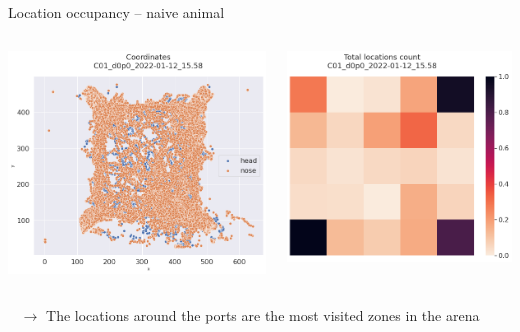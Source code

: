 \documentclass[bigger]{beamer}
\begin{document}
\begin{frame}[label={sec:org95a4104}]{Location occupancy -- naive animal}
\begin{columns}
\begin{column}{0.5\columnwidth}
\begin{center}
\includegraphics[width=.9\linewidth]{img/C01_d0p0_2022-01-12_15.58_coordinates.png}
\end{center}
\end{column}
\begin{column}{0.5\columnwidth}
\begin{center}
\includegraphics[width=.9\linewidth]{img/C01_d0p0_2022-01-12_15.58_locations_count.png}
\end{center}
\end{column}
\end{columns}
\begin{block}{~}
\(\to\) The locations around the ports are the most visited zones in the arena
\end{block}
\end{frame}
\end{document}
